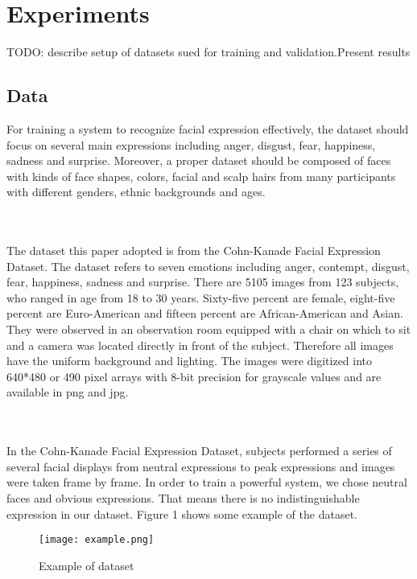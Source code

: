 \section{Experiments}

TODO: describe setup of datasets sued for training and validation.Present results

\subsection{Data}
For training a system to recognize facial expression effectively, the dataset should focus on several main expressions including anger, disgust, fear, happiness, sadness and surprise. Moreover, a proper dataset should be composed of faces with kinds of face shapes, colors, facial and scalp hairs from many participants with different genders, ethnic backgrounds and ages. 

\\
\\
The dataset this paper adopted is from the Cohn-Kanade Facial Expression Dataset. The dataset refers to seven emotions including anger, contempt, disgust, fear, happiness, sadness and surprise. There are 5105 images from 123 subjects, who ranged in age from 18 to 30 years. Sixty-five percent are female, eight-five percent are Euro-American and fifteen percent are African-American and Asian. They were observed in an observation room equipped with a chair on which to sit and a camera was located directly in front of the subject. Therefore all images have the uniform background and lighting. The images were digitized into 640*480 or 490 pixel arrays with 8-bit precision for grayscale values and are available in png and jpg. 

\\
\\
In the Cohn-Kanade Facial Expression Dataset, subjects performed a series of several facial displays from neutral expressions to peak expressions and images were taken frame by frame. In order to train a powerful system, we chose neutral faces and obvious expressions. That means there is no indistinguishable expression in our dataset. Figure 1 shows some example of the dataset.



\begin{figure}[h!]
\centering
\texttt{[image: example.png]}
\caption{Example of dataset}
\label{Example of dataset}
\end{figure}

